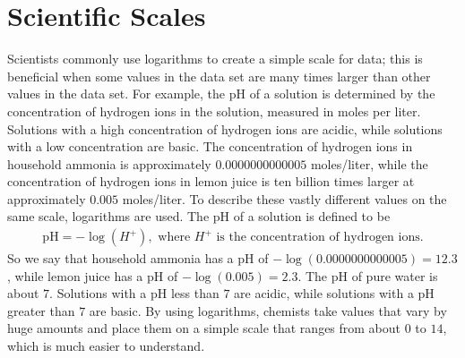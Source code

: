 \documentclass[10pt,]{book}
\theoremstyle{plain}
\theoremstyle{definition}
\theoremstyle{definition}
\theoremstyle{definition}
\numberwithin{equation}{section}
\begin{document}
\section[{Scientific Scales}]{Scientific Scales}\label{chapter05-section02}
\hypertarget{p-307}{}%
Scientists commonly use logarithms to create a simple scale for data; this is beneficial when some values in the data set are many times larger than other values in the data set. For example, the pH of a solution is determined by the concentration of hydrogen ions in the solution, measured in moles per liter. Solutions with a high concentration of hydrogen ions are acidic, while solutions with a low concentration are basic. The concentration of hydrogen ions in household ammonia is approximately \(0.0000000000005\) moles/liter, while the concentration of hydrogen ions in lemon juice is ten billion times larger at approximately \(0.005\) moles/liter.%
\hypertarget{p-308}{}%
To describe these vastly different values on the same scale, logarithms are used. The pH of a solution is defined to be%
\begin{gather*}
\text{pH} = -\log \left( H^{+} \right), \text{ where } H^{+} \text{ is the concentration of hydrogen ions.}
\end{gather*}
So we say that household ammonia has a pH of \(- \log(0.0000000000005) = 12.3\), while lemon juice has a pH of \(- \log(0.005) = 2.3\). The pH of pure water is about \(7\). Solutions with a pH less than \(7\) are acidic, while solutions with a pH greater than \(7\) are basic. By using logarithms, chemists take values that vary by huge amounts and place them on a simple scale that ranges from about \(0\) to \(14\), which is much easier to understand.%
\typeout{************************************************}
\typeout{************************************************}
\end{document}
